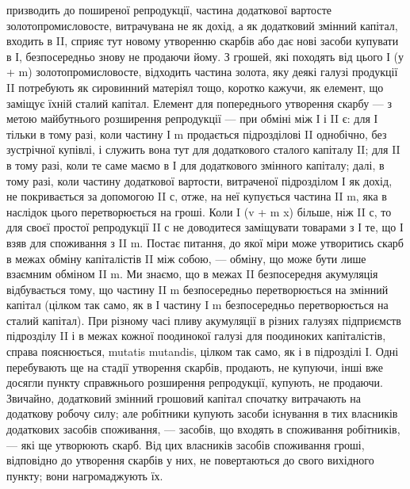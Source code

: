\parcont{}  %
призводить до поширеної репродукції, частина додаткової вартосте золотопромисловосте,
витрачувана не як дохід, а як додатковий змінний
капітал, входить в II, сприяє тут новому утворенню скарбів або дає нові
засоби купувати в І, безпосередньо знову не продаючи йому. З грошей,
які походять від цього І (у + m) золотопромисловосте, відходить частина
золота, яку деякі галузі продукції II потребують як сировинний матеріял
тощо, коротко кажучи, як елемент, що заміщує їхній сталий капітал.
Елемент для попереднього утворення скарбу — з метою майбутнього розширення
репродукції — при обміні між І і II є: для І тільки в тому разі,
коли частину І m продається підрозділові II однобічно, без зустрічної
купівлі, і служить вона тут для додаткового сталого капіталу II; для II
в тому разі, коли те саме маємо в І для додаткового змінного капіталу;
далі, в тому разі, коли частину додаткової вартости, витраченої підрозділом
І як дохід, не покривається за допомогою II с, отже, на неї купується
частина II m, яка в наслідок цього перетворюється на гроші. Коли
I (v + m x) більше, ніж II с, то для своєї простої репродукції II с не
доводитеся заміщувати товарами з І те, що І взяв для споживання з II m.
Постає питання, до якої міри може утворитись скарб в межах обміну
капіталістів II між собою, — обміну, що може бути лише взаємним
обміном II m. Ми знаємо, що в межах II безпосередня акумуляція відбувається
тому, що частину II m безпосередньо перетворюється на змінний
капітал (цілком так само, як в І частину I m безпосередньо перетворюється
на сталий капітал). При різному часі пливу акумуляції в різних галузях
підприємств підрозділу II і в межах кожної поодинокої галузі для поодиноких
капіталістів, справа пояснюється, mutatis mutandis, цілком так само,
як і в підрозділі І. Одні перебувають ще на стадії утворення скарбів,
продають, не купуючи, інші вже досягли пункту справжнього розширення
репродукції, купують, не продаючи. Звичайно, додатковий змінний грошовий
капітал спочатку витрачають на додаткову робочу силу; але робітники
купують засоби існування в тих власників додаткових засобів
споживання, — засобів, що входять в споживання робітників, — які ще
утворюють скарб. Від цих власників засобів споживання гроші, відповідно
до утворення скарбів у них, не повертаються до свого вихідного
пункту; вони нагромаджують їх.
\parbreak{}  %
